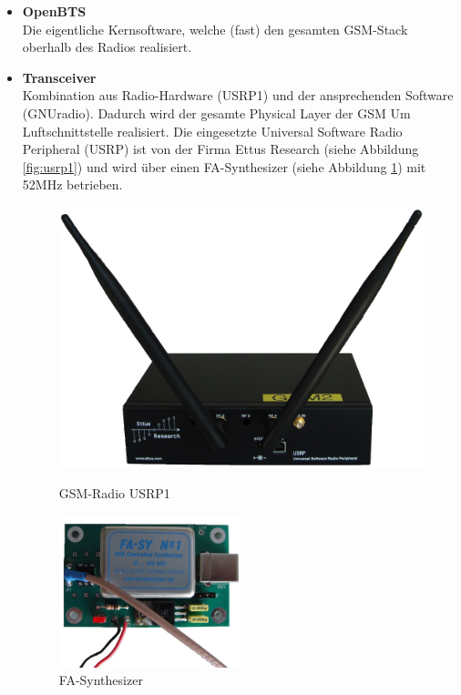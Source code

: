 \begin{itemize}
\item \textbf{OpenBTS}\\
Die eigentliche Kernsoftware, welche (fast) den gesamten GSM-Stack oberhalb des Radios realisiert.
\end{itemize}
\begin{itemize}
\item \textbf{Transceiver}\\
Kombination aus Radio-Hardware (USRP1) und der ansprechenden Software (GNUradio). Dadurch wird der gesamte Physical Layer der GSM Um Luftschnittstelle realisiert. Die eingesetzte Universal Software Radio Peripheral (USRP) ist von der Firma Ettus Research (siehe Abbildung \ref{fig:usrp1}) und wird über einen FA-Synthesizer (siehe Abbildung \ref{fig:fasyn}) mit 52MHz betrieben.
\begin{figure}[htbp]
  \centering
  \begin{minipage}[b]{6cm}
    \centering
    \includegraphics[width=1.00\textwidth]{img/usrp1.png}
    \caption{GSM-Radio USRP1}
	\label{fig:usrp1}
  \end{minipage}
  \begin{minipage}[b]{2cm}
  \end{minipage}
  \begin{minipage}[b]{6cm}
    \centering
    \includegraphics[width=0.50\textwidth]{img/frequenzgen.png}
    \caption{FA-Synthesizer}
	\label{fig:fasyn}
  \end{minipage}
\end{figure}
\end{itemize}
